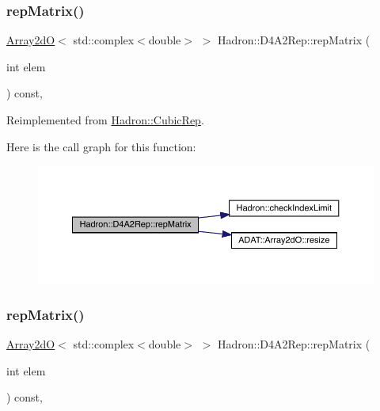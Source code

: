\subsubsection{\texorpdfstring{repMatrix()}{repMatrix()}\hspace{0.1cm}{\footnotesize\ttfamily [1/3]}}
{\footnotesize\ttfamily \mbox{\hyperlink{classADAT_1_1Array2dO}{Array2dO}}$<$ std\+::complex$<$double$>$ $>$ Hadron\+::\+D4\+A2\+Rep\+::rep\+Matrix (\begin{DoxyParamCaption}\item[{int}]{elem }\end{DoxyParamCaption}) const\hspace{0.3cm}{\ttfamily [inline]}, {\ttfamily [virtual]}}



Reimplemented from \mbox{\hyperlink{structHadron_1_1CubicRep_ac5d7e9e6f4ab1158b5fce3e4ad9e8005}{Hadron\+::\+Cubic\+Rep}}.

Here is the call graph for this function\+:
\nopagebreak
\begin{figure}[H]
\begin{center}
\leavevmode
\includegraphics[width=350pt]{d7/d66/structHadron_1_1D4A2Rep_a278dadc5305417dfc7dd7a8e1ae642d4_cgraph}
\end{center}
\end{figure}
\mbox{\label{structHadron_1_1D4A2Rep_a278dadc5305417dfc7dd7a8e1ae642d4}} 
\subsubsection{\texorpdfstring{repMatrix()}{repMatrix()}\hspace{0.1cm}{\footnotesize\ttfamily [2/3]}}
{\footnotesize\ttfamily \mbox{\hyperlink{classADAT_1_1Array2dO}{Array2dO}}$<$ std\+::complex$<$double$>$ $>$ Hadron\+::\+D4\+A2\+Rep\+::rep\+Matrix (\begin{DoxyParamCaption}\item[{int}]{elem }\end{DoxyParamCaption}) const\hspace{0.3cm}{\ttfamily [inline]}, {\ttfamily [virtual]}}



